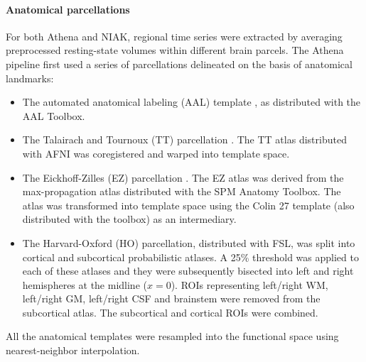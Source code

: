 \documentclass[preprint,12pt,3p]{elsarticle}
\begin{document}
\paragraph{Anatomical parcellations} For both Athena and NIAK, regional time series were extracted by averaging preprocessed resting-state volumes within different brain parcels. The Athena pipeline first used a series of parcellations delineated on the basis of anatomical landmarks:
\begin{itemize}
\item The automated anatomical labeling (AAL) template \citep{tzourio2002automated}, as distributed with the AAL Toolbox. 
\item The Talairach and Tournoux (TT) parcellation \citep{Lancaster2000automated}. The TT atlas distributed with AFNI was coregistered and warped into template space.
\item The Eickhoff-Zilles (EZ) parcellation \citep{eickhoff2005new}. The EZ atlas was derived from the max-propagation atlas distributed with the SPM Anatomy Toolbox. The atlas was transformed into template space using the Colin 27 template (also distributed with the toolbox) as an intermediary. 
\item The Harvard-Oxford (HO) parcellation, distributed with FSL, was split into cortical and subcortical probabilistic atlases. A 25\% threshold was applied to each of these atlases and they were subsequently bisected into left and right hemispheres at the midline ($x=0$). ROIs representing left/right WM, left/right GM, left/right CSF and brainstem were removed from the subcortical atlas. The subcortical and cortical ROIs were combined.
\end{itemize}
All the anatomical templates were resampled into the functional space using nearest-neighbor interpolation. 
\end{document}
